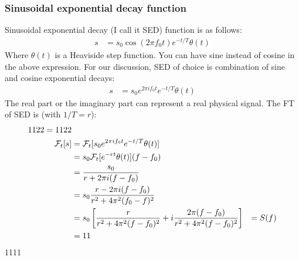 \documentclass[letterpaper, 11pt]{article}
\newcommand{\fourier}[2]{\mathcal{F}_{#1}[#2]} %
\newcommand{\sed}[1]{s_{0}e^{2\pi if_{0}#1}e^{-#1/T}} %
\numberwithin{equation}{section}
\begin{document}
\subsubsection{Sinusoidal exponential decay function}
Sinusoidal exponential decay (I call it SED) function is as follows:
\begin{align}
	s &= s_{0}\cos{(2\pi f_{0}t)}e^{-t/T} \theta(t)
\end{align}
Where \(\theta (t)\) is a Heaviside step function. You can have sine instead of cosine in the above expression. For our discussion, SED of choice is combination of sine and cosine exponential decays:
\begin{align}
	s &= \sed{t} \theta (t)
\end{align}
The real part or the imaginary part can represent a real physical signal. The FT of SED is (with \(1/T = r\)):
\begin{equation}
	\begin{aligned}[b]
		\def\a{1122}
		\a = \a \\
		\fourier{t}{s}	&= \fourier{t}{\sed{t} \theta (t)}\\
				&= s_{0}\fourier{t}{e^{-rt} \theta (t)}(f - f_{0})\\
				&= \frac{s_{0}}{r + 2\pi i(f - f_{0})} \\
				&= s_{0}\frac{r - 2\pi i(f - f_{0})}{r^2 + 4\pi^{2}(f_{0} - f)^2}\\
				&= s_{0}\left[\frac{r}{r^2 + 4\pi^{2}(f - f_{0})^2} + i\frac{2\pi(f - f_{0})}{r^2 + 4\pi^{2}(f - f_{0})^2} \right]
				&= S(f) \\
				&= 11
	\end{aligned}
\end{equation}
\def\babo{1111}
\babo
\printindex
\end{document}
